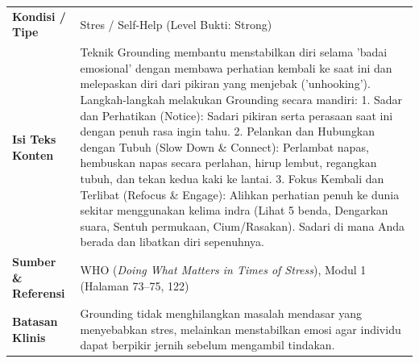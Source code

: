 \documentclass[11pt,a4paper]{article}
\begin{document}
\begin{table}[H]
\centering
\small
\begin{tabular}{|>{\raggedright\arraybackslash}p{3.8cm}|>{\raggedright\arraybackslash}p{11.6cm}|}
\hline
\rowcolor{LunaTableHead}
\multicolumn{2}{|c|}{\textbf{\color{LunaDarkText} [K002] Teknik Grounding untuk Mengatasi Badai Emosional}} \\ \hline
\textbf{Kondisi / Tipe} & Stres / Self-Help (Level Bukti: Strong) \\ \hline
\textbf{Isi Teks Konten} & Teknik Grounding membantu menstabilkan diri selama 'badai emosional' dengan membawa perhatian kembali ke saat ini dan melepaskan diri dari pikiran yang menjebak ('unhooking'). Langkah-langkah melakukan Grounding secara mandiri: 1. Sadar dan Perhatikan (Notice): Sadari pikiran serta perasaan saat ini dengan penuh rasa ingin tahu. 2. Pelankan dan Hubungkan dengan Tubuh (Slow Down \& Connect): Perlambat napas, hembuskan napas secara perlahan, hirup lembut, regangkan tubuh, dan tekan kedua kaki ke lantai. 3. Fokus Kembali dan Terlibat (Refocus \& Engage): Alihkan perhatian penuh ke dunia sekitar menggunakan kelima indra (Lihat 5 benda, Dengarkan suara, Sentuh permukaan, Cium/Rasakan). Sadari di mana Anda berada dan libatkan diri sepenuhnya. \\ \hline
\textbf{Sumber \& Referensi} & WHO (\textit{Doing What Matters in Times of Stress}), Modul 1 (Halaman 73--75, 122) \\ \hline
\textbf{Batasan Klinis} & Grounding tidak menghilangkan masalah mendasar yang menyebabkan stres, melainkan menstabilkan emosi agar individu dapat berpikir jernih sebelum mengambil tindakan. \\ \hline
\end{tabular}
\end{table}
\end{document}
